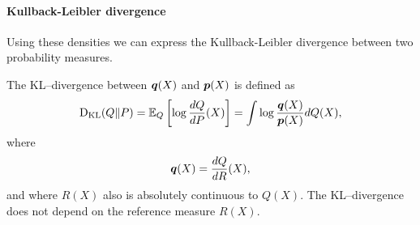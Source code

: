 \paragraph{Kullback-Leibler divergence} 
Using these densities we can express the Kullback-Leibler divergence between two probability measures. 

 The KL--divergence between $\boldsymbol{q}(X)$ and $\boldsymbol{p}(X)$ is defined as
\begin{equation}
{\rm D}_{\rm KL}(Q\Vert P) = \mathbb{E}_{Q}\left[ \log\frac{dQ}{dP}(X) \right] = \int \log\frac{\boldsymbol{q}(X)}{\boldsymbol{p}(X)}dQ(X),
\end{equation}
where 
\begin{equation}
\boldsymbol{q}(X) = \frac{dQ}{dR}(X),
\end{equation}
and where $R(X)$ also is absolutely continuous to $Q(X)$.
The KL--divergence does not depend on the reference measure $R(X)$.

